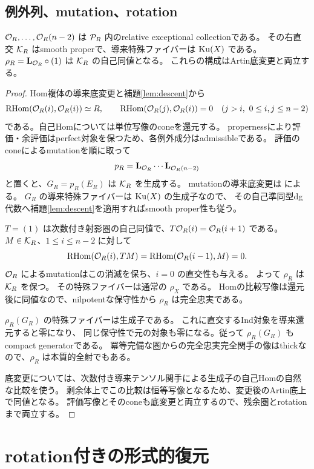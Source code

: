 \subsection{例外列、mutation、rotation}

\begin{proposition}\label{prop:relative-pair}
 \(\mathcal O_R,\ldots,\mathcal O_R(n-2)\) は \(\mathcal P_R\) 内のrelative exceptional collectionである。
 その右直交 \(\mathcal K_R\) はsmooth properで、導来特殊ファイバーは \(\operatorname{Ku}(X)\) である。
 \(\rho_R=\mathbf L_{\mathcal O_R}\circ(1)\) は \(\mathcal K_R\) の自己同値となる。
 これらの構成はArtin底変更と両立する。
\end{proposition}
\begin{proof}
 Hom複体の導来底変更と補題\ref{lem:descent}から
 \[
 \operatorname{RHom}(\mathcal O_R(i),\mathcal O_R(i))\simeq R,\qquad
 \operatorname{RHom}(\mathcal O_R(j),\mathcal O_R(i))=0\quad(j>i,\ 0\le i,j\le n-2)
 \]
 である。自己Homについては単位写像のconeを還元する。
 propernessにより評価・余評価はperfect対象を保つため、各例外成分はadmissibleである。
 評価のconeによるmutationを順に取って
 \[
 p_R=\mathbf L_{\mathcal O_R}\cdots\mathbf L_{\mathcal O_R(n-2)}
 \]
 と置くと、\(G_R=p_R(E_R)\) は \(\mathcal K_R\) を生成する。
 mutationの導来底変更は \cite[Lemma 5.14]{DDL} による。
 \(G_R\) の導来特殊ファイバーは \(\operatorname{Ku}(X)\) の生成子なので、
 その自己準同型dg代数へ補題\ref{lem:descent}を適用すればsmooth proper性も従う。

 \(T=(1)\) は次数付き射影圏の自己同値で、\(T\mathcal O_R(i)=\mathcal O_R(i+1)\) である。
 \(M\in\mathcal K_R\)、\(1\le i\le n-2\) に対して
 \[
 \operatorname{RHom}(\mathcal O_R(i),TM)=\operatorname{RHom}(\mathcal O_R(i-1),M)=0.
 \]
 \(\mathcal O_R\) によるmutationはこの消滅を保ち、\(i=0\) の直交性も与える。
 よって \(\rho_R\) は \(\mathcal K_R\) を保つ。
 その特殊ファイバーは通常の \(\rho_X\) である。
 Homの比較写像は還元後に同値なので、nilpotentな保守性から
 \(\rho_R\) は完全忠実である。

 \(\rho_R(G_R)\) の特殊ファイバーは生成子である。
 これに直交するInd対象を導来還元すると零になり、
 同じ保守性で元の対象も零になる。従って \(\rho_R(G_R)\) もcompact generatorである。
 冪等完備な圏からの完全忠実完全関手の像はthickなので、\(\rho_R\) は本質的全射でもある。

 底変更については、次数付き導来テンソル関手による生成子の自己Homの自然な比較を使う。
 剰余体上でこの比較は恒等写像となるため、変更後のArtin底上で同値となる。
 評価写像とそのconeも底変更と両立するので、残余圏とrotationまで両立する。
\end{proof}

\section{rotation付きの形式的復元}\label{sec:formal}

